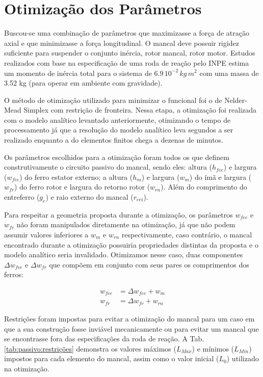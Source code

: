 \section{Otimização dos Parâmetros}

Buscou-se uma combinação de parâmetros que maximizasse a força de atração axial e que minimizasse a força longitudinal. O mancal deve possuir rigidez suficiente para suspender o conjunto inércia, rotor mancal, rotor motor. Estudos realizados com base na especificação de uma roda de reação pelo INPE estima um momento de inércia total para o sistema de $6.9 \, 10^{-2} \, kg \, m^2$ com uma massa de 3.52 kg (para operar em ambiente com gravidade). 

O método de otimização utilizado para minimizar o funcional foi o de Nelder-Mead Simplex com restrição de fronteira. Nessa etapa, a otimização foi realizada com o modelo analítico levantado anteriormente, otimizando o tempo de processamento já que a resolução do modelo analítico leva segundos a ser realizado enquanto a do elementos finitos chega a dezenas de minutos.

Os parâmetros escolhidos para a otimização foram todos os que definem construtivamente o circuito passivo do mancal, sendo eles: altura  ($h_{fee}$) e largura  ($w_{fee}$) do ferro estator externo; a altura ($h_m$) e largura ($w_m$) do ímã e largura ($w_{fr}$) do ferro rotor e largura do retorno rotor ($w_{rn}$). Além do comprimento do entreferro ($g_e$) e raio externo do mancal ($r_{eei}$).

Para respeitar a geometria proposta durante a otimização, os parâmetros $w_{fee}$ e $w_{fr}$ não foram manipulados diretamente na otimização, já que não podem assumir valores inferiores a $w_m$ e $w_{rn}$ respectivamente, caso contrário, o mancal encontrado durante a otimização possuiria propriedades distintas da proposta e o modelo analítico seria invalidado. Otimizamos nesse caso, duas componentes $\Delta w_{fee}$ e $\Delta w_{fr}$ que compõem em conjunto com seus pares os comprimentos dos ferros:

\begin{align}
w_{fee}  &= \Delta w_{fee} + w_m \\
w_{fr} &= \Delta w_{fr} + w_{rn}
\end{align}	

Restrições foram impostas para evitar a otimização do mancal para um caso em que a sua construção fosse inviável mecanicamente ou para evitar um mancal que se encontrasse fora das especificações da roda de reação. A Tab. \ref{tab:passivo:restrições} demonstra os valores máximos ($L_{Max}$) e mínimos ($L_{Min}$) impostos para cada elemento do mancal, assim como o valor inicial ($L_0$) utilizado na otimização.


